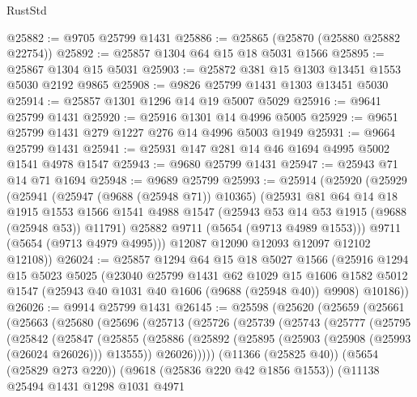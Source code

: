 \begin{lexlean}{RustStd}
\begin{coremodule}
@25882 := @9705 @25799 @1431
@25886 := @25865 (@25870 (@25880 @25882 @22754))
@25892 := @25857 @1304 @64 @15 @18 @5031 @1566
@25895 := @25867 @1304 @15 @5031
@25903 := @25872 @381 @15 @1303 @13451 @1553 @5030 @2192 @9865
@25908 := @9826 @25799 @1431 @1303 @13451 @5030
@25914 := @25857 @1301 @1296 @14 @19 @5007 @5029
@25916 := @9641 @25799 @1431
@25920 := @25916 @1301 @14 @4996 @5005
@25929 := @9651 @25799 @1431 @279 @1227 @276 @14 @4996 @5003 @1949
@25931 := @9664 @25799 @1431
@25941 := @25931 @147 @281 @14 @46 @1694 @4995 @5002 @1541 @4978 @1547
@25943 := @9680 @25799 @1431
@25947 := @25943 @71 @14 @71 @1694
@25948 := @9689 @25799
@25993 := @25914
    (@25920
      (@25929
        (@25941
          (@25947 (@9688 (@25948 @71)) @10365)
          (@25931
            @81
            @64
            @14
            @18
            @1915
            @1553
            @1566
            @1541
            @4988
            @1547
            (@25943 @53 @14 @53 @1915 (@9688 (@25948 @53)) @11791)
            @25882
            @9711
            (@5654 (@9713 @4989 @1553)))
          @9711
          (@5654 (@9713 @4979 @4995)))
        @12087
        @12090
        @12093
        @12097
        @12102
        @12108))
@26024 := @25857
    @1294
    @64
    @15
    @18
    @5027
    @1566
    (@25916
      @1294
      @15
      @5023
      @5025
      (@23040
        @25799
        @1431
        @62
        @1029
        @15
        @1606
        @1582
        @5012
        @1547
        (@25943 @40 @1031 @40 @1606 (@9688 (@25948 @40)) @9908)
        @10186))
@26026 := @9914 @25799 @1431
@26145 := @25598
    (@25620
      (@25659
        (@25661
          (@25663
            (@25680
              (@25696
                (@25713
                  (@25726
                    (@25739
                      (@25743
                        (@25777
                          (@25795
                            (@25842
                              (@25847
                                (@25855
                                  (@25886
                                    (@25892
                                      (@25895 (@25903 (@25908 (@25993 (@26024 @26026))) @13555))
                                      @26026)))))
                            (@11366 (@25825 @40))
                            (@5654 (@25829 @273 @220))
                            (@9618 (@25836 @220 @42 @1856 @1553))
                            (@11138
                              @25494
                              @1431
                              @1298
                              @1031
                              @4971

\end{coremodule}
\end{lexlean}
